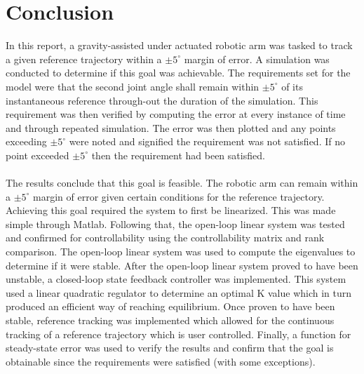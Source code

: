 \documentclass[12pt]{article}
\begin{document}
\section{Conclusion}
In this report, a gravity-assisted under actuated robotic arm was tasked to track a given reference trajectory within a  $\pm5^{\circ}$ margin of error. A simulation was conducted to determine if this goal was achievable. The requirements set for the model were that the second joint angle shall remain within $\pm5^{\circ}$ of its instantaneous reference through-out the duration of the simulation. This requirement was then verified by computing the error at every instance of time and through repeated simulation. The error was then plotted and any points exceeding $\pm5^{\circ}$ were noted and signified the requirement was not satisfied. If no point exceeded  $\pm5^{\circ}$ then the requirement had been satisfied. 
\\ \\
The results conclude that this goal is feasible. The robotic arm can remain within a $\pm5^{\circ}$ margin of error given certain conditions for the reference trajectory. Achieving this goal required the system to first be linearized. This was made simple through Matlab. Following that, the open-loop linear system was tested and confirmed for controllability using the controllability matrix and rank comparison. The open-loop linear system was used to compute the eigenvalues to determine if it were stable. After the open-loop linear system proved to have been unstable, a closed-loop state feedback controller was implemented. This system used a linear quadratic regulator to determine an optimal K value which in turn produced an efficient way of reaching equilibrium. Once proven to have been stable, reference tracking was implemented which allowed for the continuous tracking of a reference trajectory which is user controlled. Finally, a function for steady-state error was used to verify the results and confirm that the goal is obtainable since the requirements were satisfied (with some exceptions).







\end{document}
